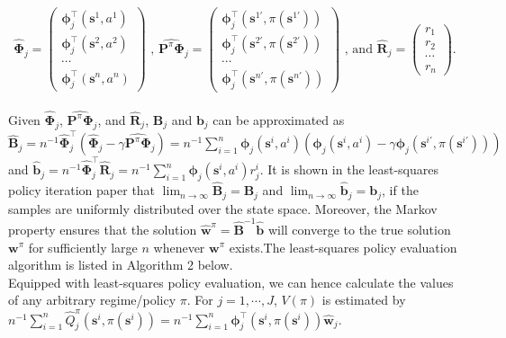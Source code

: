 \documentclass{article}
\newcommand{\wh}{\widehat}
\newcommand{\itl}{\intercal}
\newcommand{\p}{\prime}
\newcommand{\bs}{ \boldsymbol}
\newcommand{\lt}{\left}
\newcommand{\rt}{\right}
\begin{document}
$$\wh{\bs{\Phi}}_j = \begin{pmatrix}
\bs{\phi}_j^\intercal(\bs{s}^1,a^1)  \\
\bs{\phi}_j^\intercal(\bs{s}^2,a^2) \\
\cdots\\
\bs{\phi}_j^\intercal(\bs{s}^n,a^n) \end{pmatrix}
\text{ , } 
\wh{\bs{P}^{\pi}\bs{\Phi}}_j = \begin{pmatrix}
\bs{\phi}_j^\intercal(\bs{s}^{1\prime},\pi(\bs{s}^{1\prime})) \\
\bs{\phi}_j^\intercal(\bs{s}^{2\prime},\pi(\bs{s}^{2\prime})) \\
\cdots\\
\bs{\phi}_j^\intercal(\bs{s}^{n\prime},\pi(\bs{s}^{n\prime})) \end{pmatrix} 
\text{ , and }
\wh{\bs{R}}_j=  \begin{pmatrix} r_1 \\
r_2 \\
\cdots \\
r_n\end{pmatrix}.$$
\\
Given $\wh{\bs{\Phi}}_j$, $\wh{\bs{P}^{\pi}\bs{\Phi}}_j$, and $\wh{\bs{R}}_j$, $\bs{B}_j$ and $\bs{b}_j$ can be approximated as
$\wh{\bs{B}}_j = n^{-1}\wh{\bs{\Phi}}_j^{\itl}(\wh{\bs{\Phi}}_j - \gamma \wh{\bs{P}^{\pi}\bs{\Phi}}_j ) =  n^{-1}\sum_{i =1}^n  \bs{\phi}_j(\bs{s}^i,a^i) \lt( \bs{\phi}_j(\bs{s}^i,a^i) - \gamma \bs{\phi}_j\lt(\bs{s}^{i\p},\pi\lt(\bs{s}^{i\p}\rt)\rt)\rt)$ and $\wh{\bs{b}}_j =n^{-1}\wh{\bs{\Phi}}_j^{\intercal} \wh{\bs{R}}_j= n^{-1}\sum_{i=1}^n \bs{\phi}_j(\bs{s}^i, a^i) r^i_j$. It is shown in the least-squares policy iteration paper that $\lim_{n \to \infty}\wh{\bs{B}}_j = \bs{B}_j$ and $\lim_{n \to \infty}\wh{\bs{b}}_j = \bs{b}_j$, if the samples are uniformly distributed over the state space. Moreover, the Markov property ensures that the solution $\wh{\bs{w}}^{\pi} = \wh{\bs{B}}^{-1}\wh{\bs{b}}$ will converge to the true solution $\bs{w}^{\pi}$ for sufficiently large $n$  whenever  $\bs{w}^{\pi}$  exists\cite{Lagoudakis2003,Lagoudakis2001}.The least-squares policy evaluation algorithm is listed in Algorithm 2 below.\\

Equipped with least-squares policy evaluation, we can hence calculate the values of any arbitrary regime/policy $\pi$. For $j = 1, \cdots, J$, $V\lt({\pi}\rt)$ is estimated by $n^{-1}\sum_{i=1}^{n} \wh{Q}^{\pi}_j(\bs{s}^i, \pi(\bs{s}^i)) = n^{-1}\sum_{i=1}^n\bs{\phi}_j^{\intercal}(\bs{s}^i,\pi(\bs{s}^{i}))\wh{\bs{w}}_j $.
\end{document}
